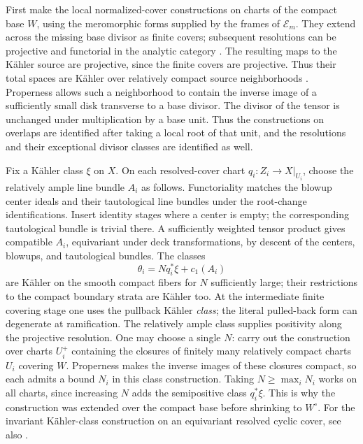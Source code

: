 First make the local normalized-cover constructions on charts of the
compact base $W$, using the meromorphic forms supplied by the frames
of $\mathcal E_m$.  They extend across the missing base divisor as
finite covers; subsequent resolutions can be projective and
functorial in the analytic category
\cite[Theorem~1.1]{BierstoneMilmanFunctorial}.
The resulting maps to the K\"ahler source are projective, since the
finite covers are projective. Thus their total spaces are K\"ahler
over relatively compact source neighborhoods
\cite[Definition~4.1 and Lemma~4.4]{FujikiDouady}. Properness allows
such a neighborhood to contain the inverse image of a sufficiently
small disk transverse to a base divisor.
The divisor of the tensor is unchanged under multiplication
by a base unit.  Thus the constructions on overlaps are identified
after taking a local root of that unit, and the resolutions and their
exceptional divisor classes are identified as well.

Fix a K\"ahler class $\xi$ on $X$.  On each resolved-cover chart
$q_i:Z_i\to X|_{U_i}$, choose the relatively ample line bundle $A_i$
as follows.  Functoriality matches the blowup center ideals and their
tautological line bundles under the root-change identifications.
Insert identity stages where a center is empty; the corresponding
tautological bundle is trivial there.  A sufficiently weighted tensor
product gives compatible $A_i$, equivariant under deck transformations,
by descent of the centers, blowups, and tautological bundles.  The classes
\[
 \theta_i=Nq_i^*\xi+c_1(A_i)
\]
are K\"ahler on the smooth compact fibers for $N$ sufficiently large;
their restrictions to the compact boundary strata are K\"ahler too.
At the intermediate finite covering stage one uses the pullback
K\"ahler \emph{class}; the literal pulled-back form can degenerate
at ramification.  The relatively ample class supplies positivity
along the projective resolution.  One may choose a single $N$:
carry out the construction over charts $U_i^+$ containing the closures
of finitely many relatively compact charts $U_i$ covering $W$.
Properness makes the inverse images of these closures compact, so
each admits a bound $N_i$ in this class construction.  Taking
$N\geq\max_iN_i$ works on all charts, since increasing $N$ adds
the semipositive class $q_i^*\xi$.  This is why the construction was
extended over the compact base before shrinking to $W^\circ$.
For the invariant K\"ahler-class construction on an equivariant
resolved cyclic cover, see also \cite[Lemma~8.1]{ChenLimits}.

